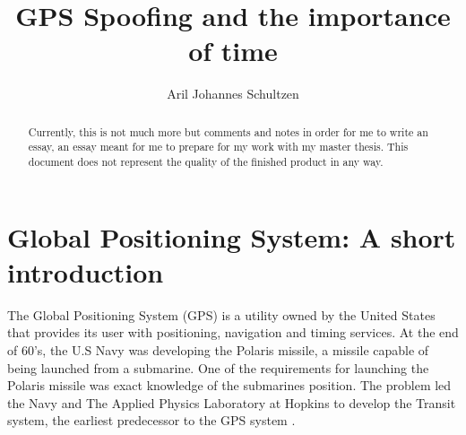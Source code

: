 \documentclass[12pt,english,a4paper]{article}
\title{GPS Spoofing and the importance of time}
\author{Aril Johannes Schultzen}
\begin{document}
\maketitle
\thispagestyle{empty}
\setcounter{page}{0}
\newpage
\tableofcontents
\thispagestyle{empty}
\setcounter{page}{0}
\newpage
\thispagestyle{empty}
\setcounter{page}{0}

\begin{abstract}
Currently, this is not much more but comments and notes in order for me to write an essay, an essay meant for me to prepare for my work with my master thesis. This document does not represent the quality of the finished product in any way.
\end{abstract}

\newpage
\clearpage
\setcounter{page}{1}

\section{Global Positioning System: A short introduction}
The Global Positioning System (GPS) is a utility owned by the United States that provides its user with positioning, navigation and timing services. At the end of 60's, the U.S Navy was developing the Polaris missile, a missile capable of being launched from a submarine. One of the requirements for launching the Polaris missile was exact knowledge of the submarines position. The problem led the Navy and The Applied Physics Laboratory at Hopkins to develop the Transit system, the earliest predecessor to the GPS system \cite{SteJ}.
\end{document}
